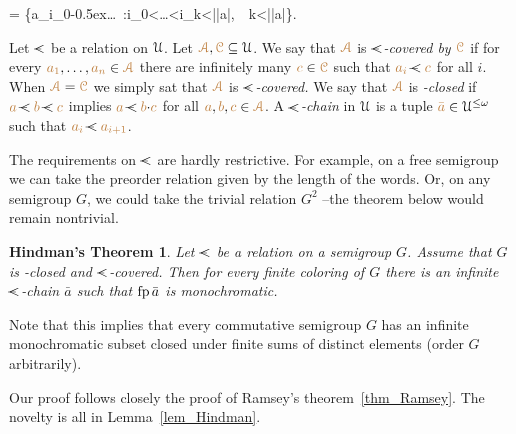 {=}
{\Big\{{\mr a_{i_0}}\kern-0.5ex\cdot\dots{}\ :\quad i_0<\dots<i_k<|{\mr\bar a}|,\ \ k<|{\mr\bar a}|\Big\}}. 

% 
% 
\bigskip
Let \emph{$\cpaw$\/} be a relation on $\EuScript U$.
Let ${\color{brown}\EuScript A},{\color{brown}\EuScript C}\subseteq\EuScript U$.
We say that ${\color{brown}\EuScript A}$ is \emph{$\cpaw$-covered by ${\color{brown}\EuScript C}$\/} 
if for every ${\color{brown} a_1},\dots,{\color{brown} a_n}\in{\color{brown}\EuScript A}$ there are infinitely many ${\color{brown} c}\in{\color{brown}\EuScript C}$ such that ${\mr a_i}\cpaw{\mr c}$ for all $i$.
When ${\color{brown}\EuScript A}={\color{brown}\EuScript C}$ we simply sat that ${\color{brown}\EuScript A}$ is \emph{$\cpaw$-covered.}
We say that ${\color{brown}\EuScript A}$ is \emph{\cpawdot-closed\/} 
if ${\mr a}\cpaw{\mr b}\cpaw{\mr c}$ implies ${\mr a}\cpaw{\mr b}{\cdot}{\mr c}$ 
for all ${\color{brown} a},{\color{brown} b},{\color{brown} c}\in{\color{brown}\EuScript A}$.
A \emph{$\cpaw$-chain\/} in $\EuScript U$ is a tuple ${\color{brown}\bar a}\in\EuScript U^{\le\omega}$ such that ${\mr a_i}\cpaw{\mr a_{i+1}}$.

The requirements on  $\cpaw$ are hardly restrictive.
For example, on a free semigroup we can take the preorder relation given by the length of the words.
%
Or, on any semigroup $G$, we could take the trivial relation $G^2$ --the theorem below would remain nontrivial.

\theoremstyle{mio}
\newtheorem{Hindman}[thm]{Hindman's Theorem}
\begin{Hindman}\label{thm_Hindman}
Let $\cpaw$ be a relation on a semigroup $G$.
%
Assume that $G$ is  \cpawdot-closed and $\cpaw$-covered.
%
Then for every finite coloring of $G$ 
there is an infinite $\cpaw$-chain $\bar a$ such that ${\rm fp}\,\bar a$ is monochromatic.
\end{Hindman}

Note that this implies that every commutative semigroup $G$ has an infinite monochromatic subset 
closed under finite sums of distinct elements (order $G$ arbitrarily).

Our proof follows closely the proof of Ramsey's theorem~\ref{thm_Ramsey}.
%
The novelty is all in Lemma~\ref{lem_Hindman}.

